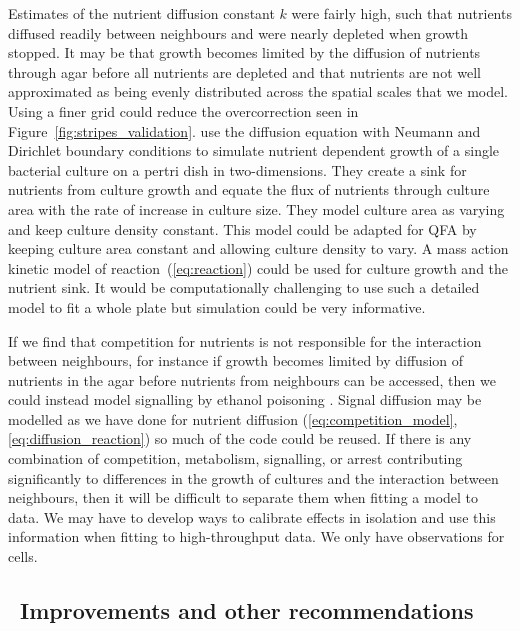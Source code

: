 Estimates of the nutrient diffusion constant \(k\) were fairly high,
such that nutrients diffused readily between neighbours and were
nearly depleted when growth stopped. It may be that growth becomes
limited by the diffusion of nutrients through agar before all
nutrients are depleted and that nutrients are not well approximated as
being evenly distributed across the spatial scales that we
model. Using a finer grid could reduce the overcorrection seen in
Figure~\ref{fig:stripes_validation}. \citet{Reo2014} use the diffusion
equation with Neumann and Dirichlet boundary conditions to simulate
nutrient dependent growth of a single bacterial culture on a pertri
dish in two-dimensions. They create a sink for nutrients from culture
growth and equate the flux of nutrients through culture area with the
rate of increase in culture size. They model culture area as varying
and keep culture density constant. This model could be adapted for QFA
by keeping culture area constant and allowing culture density to
vary. A mass action kinetic model of reaction~(\ref{eq:reaction})
could be used for culture growth and the nutrient sink. It would be
computationally challenging to use such a detailed model to fit a
whole plate but simulation could be very informative.

If we find that competition for nutrients is not responsible for the
interaction between neighbours, for instance if growth becomes limited
by diffusion of nutrients in the agar before nutrients from neighbours
can be accessed, then we could instead model signalling by ethanol
poisoning \citep{fujita2006}. Signal diffusion may be modelled as we
have done for nutrient diffusion
(\ref{eq:competition_model},\ref{eq:diffusion_reaction}) so much of
the code could be reused. If there is any combination of competition,
metabolism, signalling, or arrest contributing significantly to
differences in the growth of cultures and the interaction between
neighbours, then it will be difficult to separate them when fitting a
model to data. We may have to develop ways to calibrate effects in
isolation and use this information when fitting to high-throughput
data. We only have observations for cells.

\subsection{\thesubsection~Improvements and other recommendations}

